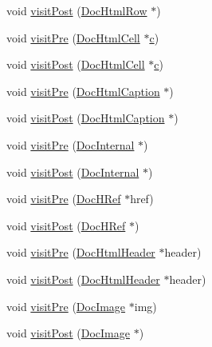 \begin{DoxyCompactItemize}
void \hyperlink{class_print_doc_visitor_a45b17a39d855a108724270e427e5243a}{visit\+Post} (\hyperlink{class_doc_html_row}{Doc\+Html\+Row} $\ast$)
\item 
void \hyperlink{class_print_doc_visitor_ac771c7dbab59fecdc41de3b4d125d2e3}{visit\+Pre} (\hyperlink{class_doc_html_cell}{Doc\+Html\+Cell} $\ast$\hyperlink{060__command__switch_8tcl_ab14f56bc3bd7680490ece4ad7815465f}{c})
\item 
void \hyperlink{class_print_doc_visitor_a6d0ad627ec0c7d5544f3ea6e301b0a61}{visit\+Post} (\hyperlink{class_doc_html_cell}{Doc\+Html\+Cell} $\ast$\hyperlink{060__command__switch_8tcl_ab14f56bc3bd7680490ece4ad7815465f}{c})
\item 
void \hyperlink{class_print_doc_visitor_a2426474dbdd2d0802e0673959666a5ba}{visit\+Pre} (\hyperlink{class_doc_html_caption}{Doc\+Html\+Caption} $\ast$)
\item 
void \hyperlink{class_print_doc_visitor_aa320b8b3334723dd4711788268c0deb6}{visit\+Post} (\hyperlink{class_doc_html_caption}{Doc\+Html\+Caption} $\ast$)
\item 
void \hyperlink{class_print_doc_visitor_a80cd54e3dd53665fa2c62cb1b7f85b4f}{visit\+Pre} (\hyperlink{class_doc_internal}{Doc\+Internal} $\ast$)
\item 
void \hyperlink{class_print_doc_visitor_adc0b1444a4120f185b4b113b6b76678d}{visit\+Post} (\hyperlink{class_doc_internal}{Doc\+Internal} $\ast$)
\item 
void \hyperlink{class_print_doc_visitor_a9f302f93b36e0df9b1a0deb8311c2fda}{visit\+Pre} (\hyperlink{class_doc_h_ref}{Doc\+H\+Ref} $\ast$href)
\item 
void \hyperlink{class_print_doc_visitor_a0eef941fe786667bf7716d1c53a4d565}{visit\+Post} (\hyperlink{class_doc_h_ref}{Doc\+H\+Ref} $\ast$)
\item 
void \hyperlink{class_print_doc_visitor_a144e05862f52be76efc4d34433404df6}{visit\+Pre} (\hyperlink{class_doc_html_header}{Doc\+Html\+Header} $\ast$header)
\item 
void \hyperlink{class_print_doc_visitor_a8a7a69ce8c9db91e7dcb9d9d266e9cfe}{visit\+Post} (\hyperlink{class_doc_html_header}{Doc\+Html\+Header} $\ast$header)
\item 
void \hyperlink{class_print_doc_visitor_a4b3bcc2666e89ae81cc72ab9a3bdcab5}{visit\+Pre} (\hyperlink{class_doc_image}{Doc\+Image} $\ast$img)
\item 
void \hyperlink{class_print_doc_visitor_a728a0cd3fe6c53fdbf1f4bd25776f3ce}{visit\+Post} (\hyperlink{class_doc_image}{Doc\+Image} $\ast$)

\end{DoxyCompactItemize}
